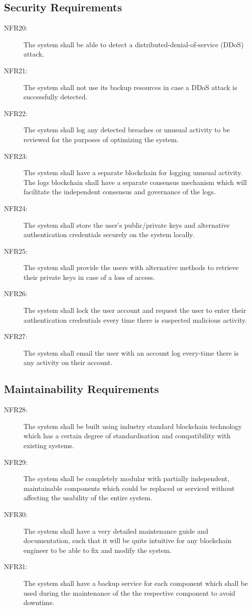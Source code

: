 \documentclass[a4paper,twoside,phd]{BYUPhys}
\begin{document}
\subsection{Security Requirements}
\begin{description}
\item[NFR20:] The system shall be able to detect a distributed-denial-of-service (DDoS) attack.
\item[NFR21:] The system shall not use its backup resources in case a DDoS attack is successfully detected.
\item[NFR22:] The system shall log any detected breaches or unusual activity to be reviewed for the purposes of optimizing the system.
\item[NFR23:] The system shall have a separate blockchain for logging unusual activity. The logs blockchain shall have a separate consensus mechanism which will facilitate the independent consensus and governance of the logs.
\item[NFR24:] The system shall store the user's public/private keys and alternative authentication credentials securely on the system locally.
\item[NFR25:] The system shall provide the users with alternative methods to retrieve their private keys in case of a loss of access.
\item[NFR26:] The system shall lock the user account and request the user to enter their authentication credentials every time there is suspected malicious activity.
\item[NFR27:] The system shall email the user with an account log every-time there is any activity on their account.
\end{description}
\subsection{Maintainability Requirements}
\begin{description}
\item[NFR28:] The system shall be built using industry standard blockchain technology which has a certain degree of standardisation and compatibility with existing systems.
\item[NFR29:] The system shall be completely modular with partially independent, maintainable components which could be replaced or serviced without affecting the usability of the entire system.
\item[NFR30:] The system shall have a very detailed maintenance guide and documentation, such that it will be quite intuitive for any blockchain engineer to be able to fix and modify the system.
\item[NFR31:] The system shall have a backup service for each component which shall be used during the maintenance of the the respective component to avoid downtime. 
\end{description}
\end{document}
